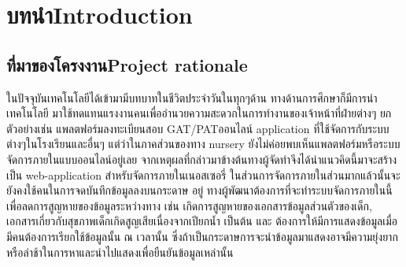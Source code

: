 \chapter{\ifcpe บทนำ\else Introduction\fi}

\section{\ifcpe ที่มาของโครงงาน\else Project rationale\fi}

ในปัจจุบันเทคโนโลยีได้เข้ามามีบทบาทในชีวิตประจําวันในทุกๆด้าน ทางด้านการศึกษาก็มีการนําเทคโนโลยี มาใช้ทดแทนแรงงานคนเพื่ออํานวยความสะดวกในการทํางานของเจ้าหน้าที่ฝ่ายต่างๆ ยกตัวอย่างเช่น แพลตฟอร์มลงทะเบียนสอบ GAT/PATออนไลน์ application ที่ใช้จัดการกับระบบต่างๆในโรงเรียนและอื่นๆ
แต่ว่าในภาคส่วนของทาง nursery ยังไม่ค่อยพบเห็นแพลตฟอร์มหรือระบบจัดการภายในแบบออนไลน์อยู่เลย
จากเหตุผลที่กล่าวมาข้างต้นทางผู้จัดทําจึงได้นำแนวคิดนี้มาจะสร้างเป็น web-application 
สําหรับจัดการภายในเนอสเซอรี่ ในส่วนการจัดการภายในส่วนมากแล้วนั้นจะยังคงใช้คนในการจดบันทึกข้อมูลลงบนกระดาษ
อยู่ ทางผู้พัฒนาต้องการที่จะทําระบบจัดการภายในนี้เพื่อลดการสูญหายของข้อมูลระหว่างทาง เช่น เกิดการสูญหายของเอกสารข้อมูลส่วนตัวของเด็ก, เอกสารเกี่ยวกับสุขภาพเด็กเกิดสูญเสียเนื่องจากเปียกน้ำ เป็นต้น และ ต้องการให้มีการแสดงข้อมูลเมื่อมีคนต้องการเรียกใช้ข้อมูลนั้น ณ เวลานั้น   ซึ่งถ้าเป็นกระดาษการจะนําข้อมูลมาแสดงอาจมีความยุ่งยากหรือล่าช้าในการหาและนําไปแสดงเพื่อยืนยันข้อมูลเหล่านั้น 



